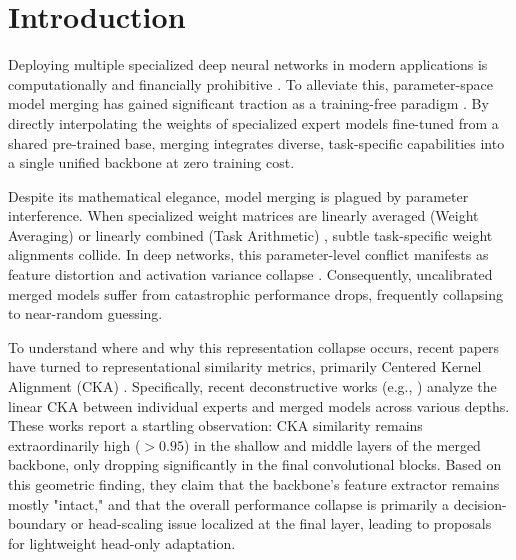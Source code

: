 \documentclass{article}
\theoremstyle{plain}
\theoremstyle{definition}
\theoremstyle{remark}
\begin{document}
\section{Introduction}
\label{sec:intro}

Deploying multiple specialized deep neural networks in modern applications is computationally and financially prohibitive \cite{caruana1997multitask, deng2009imagenet}. To alleviate this, parameter-space model merging has gained significant traction as a training-free paradigm \cite{wortsman2022model, matena2022merging, jin2022regmean}. By directly interpolating the weights of specialized expert models fine-tuned from a shared pre-trained base, merging integrates diverse, task-specific capabilities into a single unified backbone at zero training cost.

Despite its mathematical elegance, model merging is plagued by parameter interference. When specialized weight matrices are linearly averaged (Weight Averaging) or linearly combined (Task Arithmetic) \cite{ilharco2022editing}, subtle task-specific weight alignments collide. In deep networks, this parameter-level conflict manifests as feature distortion and activation variance collapse \cite{jordan2023repair}. Consequently, uncalibrated merged models suffer from catastrophic performance drops, frequently collapsing to near-random guessing.

To understand where and why this representation collapse occurs, recent papers have turned to representational similarity metrics, primarily Centered Kernel Alignment (CKA) \cite{kornblith2019similarity}. Specifically, recent deconstructive works (e.g., \cite{yang2024adamerging}) analyze the linear CKA between individual experts and merged models across various depths. These works report a startling observation: CKA similarity remains extraordinarily high ($> 0.95$) in the shallow and middle layers of the merged backbone, only dropping significantly in the final convolutional blocks. Based on this geometric finding, they claim that the backbone's feature extractor remains mostly "intact," and that the overall performance collapse is primarily a decision-boundary or head-scaling issue localized at the final layer, leading to proposals for lightweight head-only adaptation.
\end{document}
